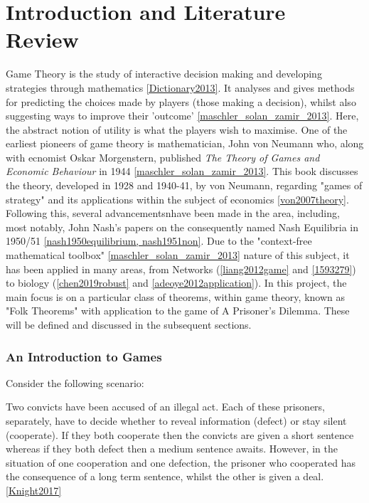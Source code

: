\chapter{Introduction and Literature Review}

Game Theory is the study of interactive decision making and developing
strategies through mathematics \ref{Dictionary2013}. It analyses and gives
methods for predicting the choices made by players (those making a decision),
whilst also suggesting ways to improve their 'outcome'
\ref{maschler_solan_zamir_2013}. Here, the abstract notion of utility is what
the players wish to maximise. One of the earliest
pioneers of game theory is mathematician, John von Neumann who, along with
ecnomist Oskar Morgenstern, published \textit{The Theory of Games and Economic
Behaviour} in 1944 \ref{maschler_solan_zamir_2013}. This book discusses the
theory, developed in 1928 and 1940-41, by von Neumann, regarding "games of
strategy" and its applications within the subject of economics
\ref{von2007theory}. Following this, several advancementsnhave been made in the
area, including, most notably, John Nash's papers on the consequently named Nash
Equilibria in 1950/51 \ref{nash1950equilibrium, nash1951non}. Due to the
"context-free mathematical toolbox" \ref{maschler_solan_zamir_2013} nature of
this subject, it has been applied in many areas, from Networks
(\ref{liang2012game} and \ref{1593279}) to biology (\ref{chen2019robust} and
\ref{adeoye2012application}). In this project, the main focus is on a particular
class of theorems, within game theory, known as "Folk Theorems" with application
to the game of A Prisoner's Dilemma. These will be defined and discussed in the
subsequent sections.

\subsection{An Introduction to Games}
Consider the following scenario:

\begin{center}
    Two convicts have been accused of an illegal act. Each of these prisoners,
    separately, have to decide whether to reveal information (defect) or stay
    silent (cooperate). If they both cooperate then the convicts are given a
    short sentence whereas if they both defect then a medium sentence awaits.
    However, in the situation of one cooperation and one defection, the prisoner
    who cooperated has the consequence of a long term sentence, whilst the other
    is given a deal. \ref{Knight2017}
\end{center}

